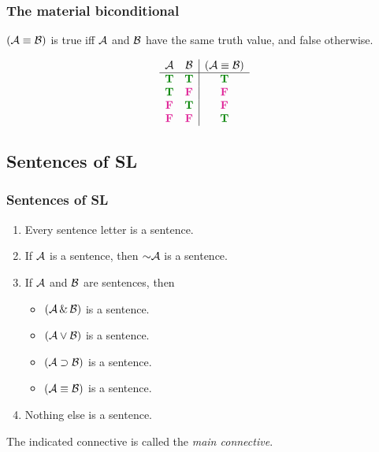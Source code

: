 \begin{frame}
  \frametitle{The material biconditional \eiff}
  
  \begin{definition}
    $(\mathcal{A} \equiv \mathcal{B})$ is true iff $\mathcal{A}$ and
    $\mathcal{B}$ have the same truth value, and false otherwise.
    \end{definition}
  \[
  \begin{array}{cc|c}
  \metav{A} & \metav{B} & (\metav{A} \eiff \metav{B})\\
  \hline
  \True & \True & \True\\
  \True & \False & \False\\
  \False & \True & \False\\
  \False & \False & \True
  \end{array}
  \]
  
\end{frame}

\subsection{Sentences of SL}

\begin{frame}
\frametitle{Sentences of SL}

  \begin{definition}
  \begin{enumerate}
  \item Every sentence letter is a sentence.
  \item If $\mathcal{A}$ is a sentence, then $\enot\metav{A}$ is a sentence.
  \item If $\mathcal{A}$ and $\mathcal{B}$ are sentences, then
  \begin{itemize}
  \item $(\mathcal{A}\,\&\,\mathcal{B})$ is a sentence.
  \item $(\mathcal{A}\vee\mathcal{B})$ is a sentence.
  \item $(\mathcal{A}\supset\mathcal{B})$ is a sentence.
  \item $(\mathcal{A}\equiv\mathcal{B})$ is a sentence.
  \end{itemize}
  \item Nothing else is a sentence.
  \end{enumerate}
  \end{definition}

  The indicated connective is called the \emph{main connective}.
\end{frame}

